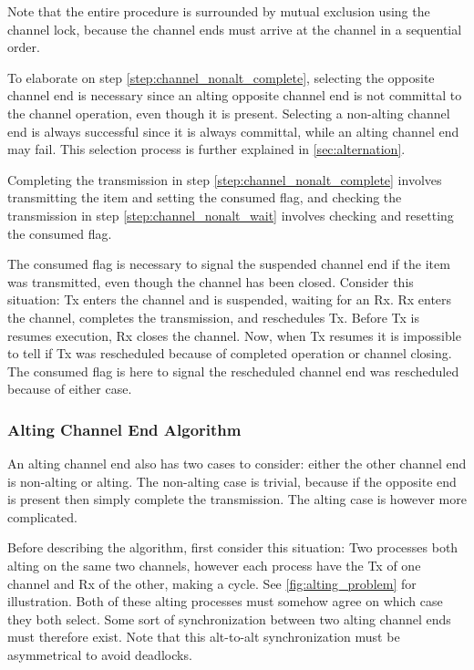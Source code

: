 Note that the entire procedure is surrounded by mutual exclusion using the channel lock, because the channel ends must arrive at the channel in a sequential order.

To elaborate on step \ref{step:channel_nonalt_complete}, selecting the opposite channel end is necessary since an alting opposite channel end is not committal to the channel operation, even though it is present. Selecting a non\hyp{}alting channel end is always successful since it is always committal, while an alting channel end may fail. This selection process is further explained in \cref{sec:alternation}.

Completing the transmission in step \ref{step:channel_nonalt_complete} involves transmitting the item and setting the consumed flag, and checking the transmission in step \ref{step:channel_nonalt_wait} involves checking and resetting the consumed flag.

The consumed flag is necessary to signal the suspended channel end if the item was transmitted, even though the channel has been closed. Consider this situation: Tx enters the channel and is suspended, waiting for an Rx. Rx enters the channel, completes the transmission, and reschedules Tx. Before Tx is resumes execution, Rx closes the channel. Now, when Tx resumes it is impossible to tell if Tx was rescheduled because of completed operation or channel closing. The consumed flag is here to signal the rescheduled channel end was rescheduled because of either case.


\subsubsection{Alting Channel End Algorithm}

An alting channel end also has two cases to consider: either the other channel end is non\hyp{}alting or alting. The non\hyp{}alting case is trivial, because if the opposite end is present then simply complete the transmission. The alting case is however more complicated. 

Before describing the algorithm, first consider this situation: Two processes both alting on the same two channels, however each process have the Tx of one channel and Rx of the other, making a cycle. See \cref{fig:alting_problem} for illustration. Both of these alting processes must somehow agree on which case they both select. Some sort of synchronization between two alting channel ends must therefore exist. Note that this alt\hyp{}to\hyp{}alt synchronization must be asymmetrical to avoid deadlocks.

